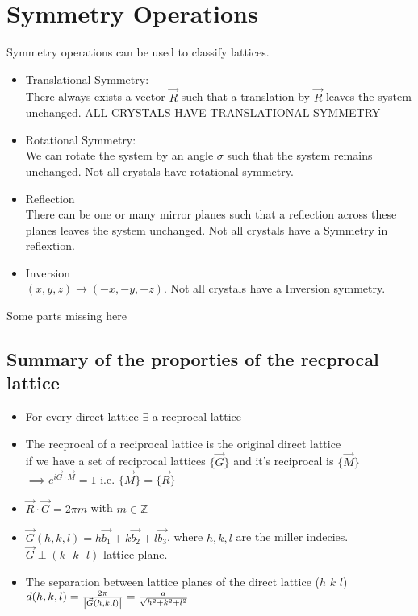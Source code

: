 \documentclass{report}
\begin{document}
\section{Symmetry Operations}
Symmetry operations can be used to classify lattices.
\begin{itemize}
	\item Translational Symmetry:\\
		There always exists a vector $\vec{R}$ such that a translation by $\vec{R}$ leaves the system unchanged. ALL CRYSTALS HAVE TRANSLATIONAL SYMMETRY
	\item Rotational Symmetry:\\
		We can rotate the system by an angle $\sigma$ such that the system remains unchanged. Not all crystals have rotational symmetry.
	\item Reflection\\
		There can be one or many mirror planes such that a reflection across these planes leaves the system unchanged. Not all crystals have a Symmetry in reflextion.
	\item Inversion\\
		$\left( x, y, z \right) \to \left( -x, -y, -z \right) $. Not all crystals have a Inversion symmetry.
\end{itemize}
Some parts missing here\\
\subsection{Summary of the proporties of the recprocal lattice}
\begin{itemize}
	\item For every direct lattice $\exists$ a recprocal lattice
	\item The recprocal of a reciprocal lattice is the original direct lattice\\
		if we have a set of reciprocal lattices $\{\vec{G}\}$ and  it's reciprocal is $\{\vec{M}\}$\\
		$\implies e^{i \vec{G} \cdot \vec{M}} = 1$ i.e. $\{\vec{M}\} = \{\vec{R}\}$
		\item $\vec{R} \cdot \vec{G} = 2 \pi m$ with $m \in \mathbb{Z}$
	\item  $\vec{G}\left( h,k,l \right) = h \vec{b_1} + k \vec{b_2} + l \vec{b_3}$, where $h,k,l$ are the miller indecies. $\vec{G} \perp \left( k \text{ } k \text{ } l \right) $ lattice plane.
\item The separation between lattice planes of the direct lattice ($h$ $k$ $l$) \\
		$d(h,k,l) = \frac{2\pi}{\abs{\vec{G}(h,k,l)}} = \frac{a}{\sqrt{h^2 + k^2 + l^2} }$
\end{itemize}
\end{document}
